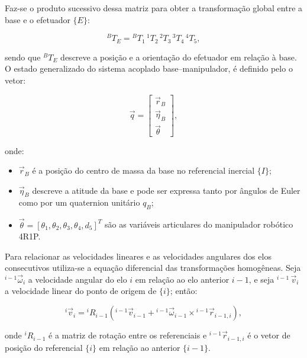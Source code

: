 Faz-se o produto sucessivo dessa matriz para obter a transformação global entre a base e o efetuador $\{E\}$:

\begin{equation}
\label{eq:transformacao_total}
{}^{B} T_{E}
=
{}^{B} T_1\,
{}^{1} T_2\,
{}^{2} T_3\,
{}^{3} T_4\,
{}^{4} T_5,
\end{equation}

sendo que ${}^{B} T_{E}$ descreve a posição e a orientação do efetuador em relação à base.
O estado generalizado do sistema acoplado base--manipulador, é definido pelo o vetor:

\begin{equation}
\label{eq:vetor_q}
\vec{q} =
\begin{bmatrix}
\vec{r}_B \\[4pt]
\vec{\eta}_B \\[4pt]
\vec{\theta}
\end{bmatrix},
\end{equation}

onde:
\begin{itemize}
    \item $\vec{r}_B$ é a posição do centro de massa da base no referencial inercial $\{I\}$;
    \item $\vec{\eta}_B$ descreve a atitude da base e pode ser expressa tanto por ângulos de Euler como por um quaternion unitário $q_B$;
    \item $\vec{\theta} = [\theta_1,\theta_2,\theta_3,\theta_4,d_5]^T$ são as variáveis articulares do manipulador robótico 4R1P.
\end{itemize}

Para relacionar as velocidades lineares e as velocidades angulares dos elos consecutivos utiliza-se a equação diferencial das transformações homogêneas.
Seja ${}^{i-1} \vec{\omega}_i$ a velocidade angular do elo $i$ em relação ao elo anterior $i-1$, e seja ${}^{i-1}\,\vec{v}_i$ a velocidade linear do ponto de origem de $\{i\}$; então:

\begin{equation}
\label{eq:relacao_velocidades}
{}^{i} \vec{v}_i
=
{}^{i}R_{i-1} \left( {}^{i-1} \vec{v}_{i-1} + {}^{i-1} \vec{\omega}_{i-1} \times {}^{i-1} \vec{r}_{i-1,i} \right),
\end{equation}

onde ${}^{i}R_{i-1}$ é a matriz de rotação entre os referenciais e ${}^{i-1} \vec{r}_{i-1,i}$ é o vetor de posição do referencial $\{i\}$ em relação ao anterior $\{i-1\}$.